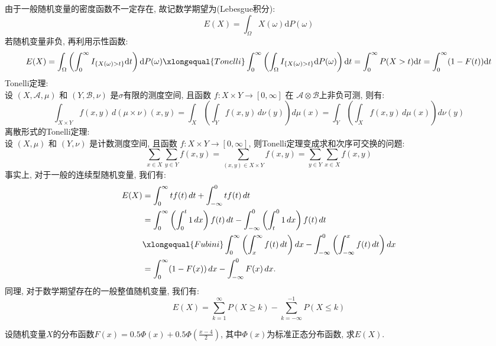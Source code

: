 \documentclass[standard]{ExBook}
\renewenvironment{shaded}{%
  \def\FrameCommand{\fboxsep=\FrameSep \colorbox{shadecolor}}%
  \MakeFramed{\advance\hsize-\width \FrameRestore}%
}{%
  \endMakeFramed
}
\begin{document}
\begin{qitems}
由于一般随机变量的密度函数不一定存在, 故记数学期望为(Lebesgue积分):
$$E(X)=\int_{\Omega}X(\omega)\mathrm{d}P(\omega)$$
若随机变量非负, 再利用示性函数:
$$E(X)=\int_{\Omega}\left(\int_{0}^{\infty}I_{\{X(\omega)>t\}}\mathrm{d}t\right)\mathrm{d}P(\omega) \xlongequal{Tonelli}\int_{0}^{\infty}\left(\int_{\Omega}I_{\{X(\omega)>t\}}\mathrm{d}P(\omega)\right)\mathrm{d}t=\int_{0}^{\infty}P(X>t)\mathrm{d}t=\int_{0}^{\infty}(1-F(t))\mathrm{d}t$$
\textcolor{themeColor}{\selectfont {}
Tonelli定理:\\
设 $(X, \mathcal{A}, \mu)$ 和 $(Y, \mathcal{B}, \nu)$ 是$\sigma$有限的测度空间, 且函数 $f: X \times Y \to [0, \infty]$ 在 $\mathcal{A} \otimes \mathcal{B}$上非负可测, 则有:
\[
\int_{X \times Y} f(x,y)\, d(\mu \times \nu)(x,y)
= \int_X \left( \int_Y f(x,y)\, d\nu(y) \right) d\mu(x)
= \int_Y \left( \int_X f(x,y)\, d\mu(x) \right) d\nu(y)
\]
离散形式的Tonelli定理:\\
设 $(X, \mu)$ 和 $(Y, \nu)$ 是计数测度空间, 且函数 $f: X \times Y \to [0, \infty]$, 则Tonelli定理变成求和次序可交换的问题:
\[
\sum_{x \in X} \sum_{y \in Y} f(x, y)
= \sum_{(x, y) \in X \times Y} f(x, y)
= \sum_{y \in Y} \sum_{x \in X} f(x, y)
\]
}
\textcolor{themeColor}{\selectfont {}事实上, 对于一般的连续型随机变量, 我们有:
\begin{align*}
E(X) 
&= \int_{0}^{\infty} t f(t) \, dt + \int_{-\infty}^{0} t f(t) \, dt \\
&= \int_{0}^{\infty} \left( \int_{0}^{t} 1 \, dx \right) f(t) \, dt - \int_{-\infty}^{0} \left( \int_{t}^{0} 1 \, dx \right) f(t) \, dt \\
&\xlongequal{Fubini} \int_{0}^{\infty} \left( \int_{x}^{\infty} f(t) \, dt \right) dx - \int_{-\infty}^{0} \left( \int_{-\infty}^{x} f(t) \, dt \right) dx \\
&= \int_{0}^{\infty} (1 - F(x)) \, dx - \int_{-\infty}^{0} F(x) \, dx.
\end{align*}
同理, 对于数学期望存在的一般整值随机变量, 我们有:
\[
E(X) = \sum_{k=1}^{\infty} P(X \geq k) - \sum_{k=-\infty}^{-1} P(X \leq k)
\]
}

\vspace{2.5cm-5em}

    \begin{bbox}
    \begin{shaded}
        \qitem
设随机变量$ X $的分布函数$F(x)=0.5\Phi(x)+0.5\Phi\left(\displaystyle\frac{x-4}{2}\right)$, 其中$\Phi(x)$为标准正态分布函数, 求$E(X)$.
    \end{shaded}
    \end{bbox}


\end{qitems}
\end{document}
